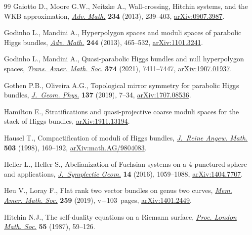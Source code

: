 \documentclass[pdftex]{sigma}
\numberwithin{equation}{section}
\begin{document}
\begin{thebibliography}{99}
Gaiotto D., Moore G.W., Neitzke A., Wall-crossing, {H}itchin systems, and the
 {WKB} approximation, \href{https://doi.org/10.1016/j.aim.2012.09.027}{\textit{Adv. Math.}} \textbf{234} (2013), 239--403,
 \href{https://arxiv.org/abs/0907.3987}{arXiv:0907.3987}.

Godinho L., Mandini A., Hyperpolygon spaces and moduli spaces of parabolic
 {H}iggs bundles, \href{https://doi.org/10.1016/j.aim.2013.04.026}{\textit{Adv. Math.}} \textbf{244} (2013), 465--532,
 \href{https://arxiv.org/abs/1101.3241}{arXiv:1101.3241}.

Godinho L., Mandini A., Quasi-parabolic {H}iggs bundles and null hyperpolygon
 spaces, \href{https://doi.org/10.1090/tran/8450}{\textit{Trans. Amer. Math. Soc.}} \textbf{374} (2021), 7411--7447,
 \href{https://arxiv.org/abs/1907.01937}{arXiv:1907.01937}.

Gothen P.B., Oliveira A.G., Topological mirror symmetry for parabolic {H}iggs
 bundles, \href{https://doi.org/10.1016/j.geomphys.2018.08.020}{\textit{J.~Geom. Phys.}} \textbf{137} (2019), 7--34,
 \href{https://arxiv.org/abs/1707.08536}{arXiv:1707.08536}.

Hamilton E., Stratifications and quasi-projective coarse moduli spaces for the
 stack of {H}iggs bundles, \href{https://arxiv.org/abs/1911.13194}{arXiv:1911.13194}.

Hausel T., Compactification of moduli of {H}iggs bundles, \href{https://doi.org/10.1515/crll.1998.096}{\textit{J.~Reine
 Angew. Math.}} \textbf{503} (1998), 169--192, \href{https://arxiv.org/abs/math.AG/9804083}{arXiv:math.AG/9804083}.

Heller L., Heller S., Abelianization of {F}uchsian systems on a 4-punctured
 sphere and applications, \href{https://doi.org/10.4310/JSG.2016.v14.n4.a4}{\textit{J.~Symplectic Geom.}} \textbf{14} (2016),
 1059--1088, \href{https://arxiv.org/abs/1404.7707}{arXiv:1404.7707}.

Heu V., Loray F., Flat rank two vector bundles on genus two curves,
 \href{https://doi.org/10.1090/memo/1247}{\textit{Mem. Amer. Math. Soc.}} \textbf{259} (2019), v+103~pages,
 \href{https://arxiv.org/abs/1401.2449}{arXiv:1401.2449}.

Hitchin N.J., The self-duality equations on a {R}iemann surface, \href{https://doi.org/10.1112/plms/s3-55.1.59}{\textit{Proc.
 London Math. Soc.}} \textbf{55} (1987), 59--126.


\end{thebibliography}
\end{document}
